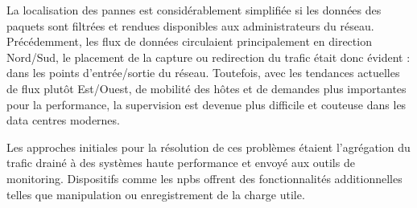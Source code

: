 La localisation des pannes est considérablement simplifiée si les données des paquets sont filtrées et rendues disponibles aux administrateurs du réseau. Précédemment, les flux de données circulaient principalement en direction Nord/Sud, le placement de la capture ou redirection du trafic était donc évident : dans les points d'entrée/sortie du réseau. Toutefois, avec les tendances actuelles de flux plutôt Est/Ouest, de mobilité des hôtes et de demandes plus importantes pour la performance, la supervision est devenue plus difficile et couteuse dans les data centres modernes.

Les approches initiales pour la résolution de ces problèmes étaient l'agrégation du trafic drainé à des systèmes haute performance et envoyé aux outils de monitoring. Dispositifs comme les \glspl{npb} offrent des fonctionnalités additionnelles telles que manipulation ou enregistrement de la charge utile. 

